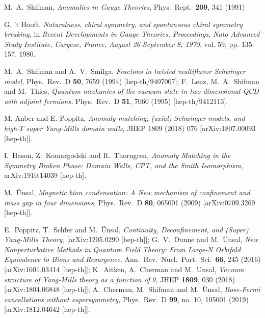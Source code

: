 \documentclass[epsfig,12pt]{article}
\begin{document}
\begin{thebibliography}{99}
{  
M.~A.~Shifman,
{\em Anomalies in Gauge Theories},
  Phys.\ Rept.\  {\bf 209}, 341 (1991)
  
  G. 't Hooft, {\em Naturalness, chiral symmetry, and spontaneous chiral
symmetry breaking,} in {\sl Recent Developments in Gauge Theories.
Proceedings, Nato Advanced Study Institute, Cargese, France, August 26-September 8, 1979}, vol. 59, pp. 135-157. 1980.

  M.~A.~Shifman and A.~V.~Smilga,
{\em Fractons in twisted multiflavor Schwinger model,}
  Phys.\ Rev.\ D {\bf 50}, 7659 (1994)
  [hep-th/9407007];
  F.~Lenz, M.~A.~Shifman and M.~Thies,
 {\em Quantum mechanics of the vacuum state in two-dimensional QCD with adjoint fermions,}
  Phys.\ Rev.\ D {\bf 51}, 7060 (1995)
  [hep-th/9412113].
  
M. Anber and  E. Poppitz, 
{\em Anomaly matching, (axial) Schwinger models, and high-$T$ super Yang-Mills domain walls}, 
JHEP 1809 (2018) 076 
[arXiv:1807.00093 [hep-th]].

 I.~Hason, Z.~Komargodski and R.~Thorngren,
{\em Anomaly Matching in the Symmetry Broken Phase: Domain Walls, CPT, and the Smith Isomorphism,}
  arXiv:1910.14039 [hep-th].

  M.~\"Unsal,
{\em Magnetic bion condensation: A New mechanism of confinement and
mass gap in four dimensions,}
 Phys.\ Rev.\ D {\bf 80}, 065001 (2009)
 [arXiv:0709.3269 [hep-th]].
  
  E.~Poppitz, T.~Sch\"fer and M.~\"Unsal,
{\em Continuity, Deconfinement, and (Super) Yang-Mills Theory,}
  [arXiv:1205.0290 [hep-th]];
  G.~V.~Dunne and M.~\"Unsal,
{\em New Nonperturbative Methods in Quantum Field Theory: From Large-N Orbifold Equivalence to Bions and Resurgence,}
  Ann.\ Rev.\ Nucl.\ Part.\ Sci.\  {\bf 66}, 245 (2016)
  [arXiv:1601.03414 [hep-th]];
  K.~Aitken, A.~Cherman and M.~Unsal,
{\em Vacuum structure of Yang-Mills theory as a function of $\theta$},
  JHEP {\bf 1809}, 030 (2018)
  [arXiv:1804.06848 [hep-th]];
  A.~Cherman, M.~Shifman and M.~\"Unsal,
{\em Bose-Fermi cancellations without supersymmetry,}
  Phys.\ Rev.\ D {\bf 99}, no. 10, 105001 (2019)
  [arXiv:1812.04642 [hep-th]].
  
}
\end{thebibliography}
\end{document}
